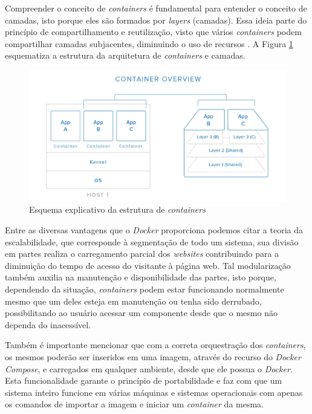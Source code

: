 Compreender o conceito de \textit{containers} é fundamental para entender o conceito de camadas, isto porque eles são formados por \textit{layers} (camadas). Essa ideia parte do princípio de compartilhamento e reutilização, visto que vários \textit{containers} podem compartilhar camadas subjacentes, diminuindo o uso de recursos . A Figura \ref{containers} esquematiza a estrutura da arquitetura de \textit{containers} e camadas.

\newpage

\begin{figure}[htb]
 \centering
 \caption{Esquema explicativo da estrutura de \textit{containers}}
 \includegraphics[scale=0.6]{figuras/containers}
 
 \label{containers}
\end{figure}

Entre as diversas vantagens que o \textit{Docker} proporciona podemos citar a teoria da escalabilidade, que corresponde à segmentação de todo um sistema, sua divisão em partes realiza o carregamento parcial dos \textit{websites} contribuindo para a diminuição do tempo de acesso do visitante à página web. Tal modularização também auxilia na manutenção e disponibilidade das partes, isto porque, dependendo da situação, \textit{containers} podem estar funcionando normalmente mesmo que um deles esteja em manutenção ou tenha sido derrubado, possibilitando ao usuário acessar um componente desde que o mesmo não dependa do inacessível. 

Também é importante mencionar que com a correta orquestração dos \textit{containers}, os mesmos poderão ser inseridos em uma imagem, através do recurso do \textit{Docker Compose}, e carregados em qualquer ambiente, desde que ele possua o \textit{Docker}. Esta funcionalidade garante o princípio de portabilidade e faz com que um sistema inteiro funcione em várias máquinas e sistemas operacionais com apenas os comandos de importar a imagem e iniciar um \textit{container} da mesma.

